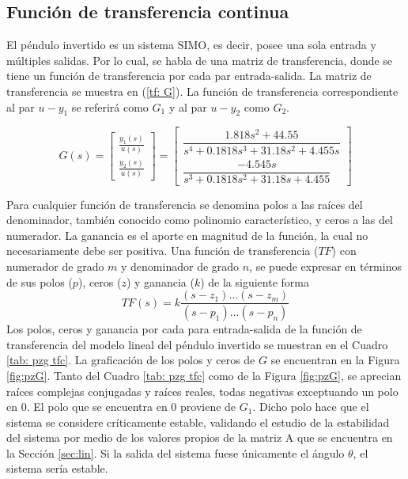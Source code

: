 \documentclass[journal]{IEEEtran}
\begin{document}
\subsection{Función de transferencia continua}\label{sub:ftc}
El péndulo invertido es un sistema SIMO, es decir, posee una sola entrada y múltiples salidas. Por lo cual, se habla de una matriz de transferencia, donde se tiene un función de transferencia por cada par entrada-salida. La matriz de transferencia se muestra en (\ref{tf: G}). La función de transferencia correspondiente al par $u-y_1$ se referirá como $G_1$ y al par $u-y_2$ como $G_2$.

\begin{equation}
\label{tf: G}
 G(s) = \begin{bmatrix}
	\frac{y_1(s)}{u(s)}\\
	\frac{y_2(s)}{u(s)}
\end{bmatrix} = 
\begin{bmatrix}
    \dfrac{1.818 s^2 + 44.55}{s^4 + 0.1818 s^3 + 31.18 s^2 + 4.455 s}\\
	\dfrac{-4.545 s}{s^3 + 0.1818 s^2 + 31.18 s + 4.455}
\end{bmatrix}
\end{equation}
\textbf{}

Para cualquier función de transferencia se denomina polos a las raíces del denominador, también conocido como polinomio característico, y ceros a las del numerador. La ganancia es el aporte en magnitud de la función, la cual no necesariamente debe ser positiva. Una función de transferencia ($TF$) con numerador de grado $m$ y denominador de grado $n$, se puede expresar en términos de sus polos ($p$), ceros ($z$) y ganancia ($k$) de la siguiente forma
\[
TF(s) = k\dfrac{(s - z_1)...(s - z_m)}{(s - p_1)...(s - p_n)}
\]
Los polos, ceros y ganancia por cada para entrada-salida de la función de transferencia del modelo lineal del péndulo invertido se muestran en el Cuadro \ref{tab: pzg tfc}. La graficación de los polos y ceros de $G$ se encuentran en la Figura \ref{fig:pzG}. Tanto del Cuadro \ref{tab: pzg tfc} como de la Figura \ref{fig:pzG}, se aprecian raíces complejas conjugadas y raíces reales, todas negativas exceptuando un polo en 0. El polo que se encuentra en 0 proviene de $G_1$. Dicho polo hace que el sistema se considere críticamente estable, validando el estudio de la estabilidad del sistema por medio de los valores propios de la matriz A que se encuentra en la Sección \ref{sec:lin}. Si la salida del sistema fuese únicamente el ángulo $\theta$, el sistema sería estable.\\
\end{document}
